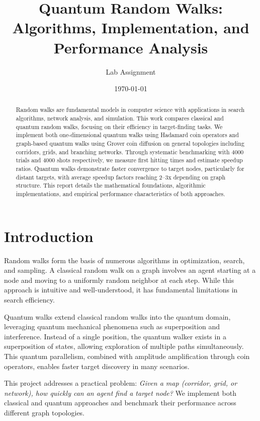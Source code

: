 \documentclass[12pt,a4paper]{article}
\title{Quantum Random Walks: Algorithms, Implementation, and Performance Analysis}
\author{Lab Assignment}
\date{\today}
\begin{document}
\maketitle

\begin{abstract}
Random walks are fundamental models in computer science with applications in search algorithms, network analysis, and simulation. This work compares classical and quantum random walks, focusing on their efficiency in target-finding tasks. We implement both one-dimensional quantum walks using Hadamard coin operators and graph-based quantum walks using Grover coin diffusion on general topologies including corridors, grids, and branching networks. Through systematic benchmarking with 4000 trials and 4000 shots respectively, we measure first hitting times and estimate speedup ratios. Quantum walks demonstrate faster convergence to target nodes, particularly for distant targets, with average speedup factors reaching 2--3x depending on graph structure. This report details the mathematical foundations, algorithmic implementations, and empirical performance characteristics of both approaches.
\end{abstract}

\section{Introduction}

Random walks form the basis of numerous algorithms in optimization, search, and sampling. A classical random walk on a graph involves an agent starting at a node and moving to a uniformly random neighbor at each step. While this approach is intuitive and well-understood, it has fundamental limitations in search efficiency.

Quantum walks extend classical random walks into the quantum domain, leveraging quantum mechanical phenomena such as superposition and interference. Instead of a single position, the quantum walker exists in a superposition of states, allowing exploration of multiple paths simultaneously. This quantum parallelism, combined with amplitude amplification through coin operators, enables faster target discovery in many scenarios.

This project addresses a practical problem: \textit{Given a map (corridor, grid, or network), how quickly can an agent find a target node?} We implement both classical and quantum approaches and benchmark their performance across different graph topologies.
\end{document}
